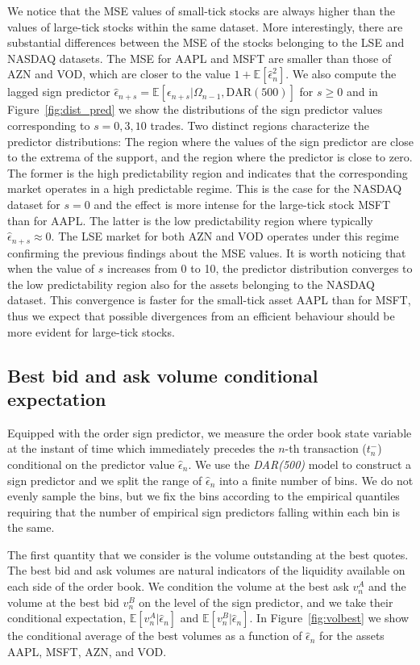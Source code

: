 \documentclass[12pt]{iopart}
\begin{document}
We notice that the MSE values of small-tick stocks are always higher than the values of large-tick stocks within the same dataset. More interestingly, there are substantial differences between the MSE of the stocks belonging to the LSE and NASDAQ datasets. The MSE for AAPL and MSFT are smaller than those of AZN and VOD, which are closer to the value $1+\mathbb{E}[\hat{\epsilon}_n^2]$. We also compute the lagged sign predictor $\hat{\epsilon}_{n+s}=\mathbb{E}[\epsilon_{n+s}|\Omega_{n-1},\mathrm{DAR(500)}]$ for $s\geq 0$ and in Figure~\ref{fig:dist_pred} we show the distributions of the sign predictor values corresponding to $s=0,3,10$ trades. Two distinct regions characterize the predictor distributions: The region where the values of the sign predictor are close to the extrema of the support, and the region where the predictor is close to zero. The former is the high predictability region and indicates that the corresponding market operates in a high predictable regime. This is the case for the NASDAQ dataset for $s=0$ and the effect is more intense for the large-tick stock MSFT than for AAPL. The latter is the low predictability region where typically $\hat{\epsilon}_{n+s}\approx 0$. The LSE market for both AZN and VOD operates under this regime confirming the previous findings about the MSE values. It is worth noticing that when the value of $s$ increases from 0 to 10, the predictor distribution converges to the low predictability region also for the assets belonging to the NASDAQ dataset. This convergence is faster for the small-tick asset AAPL than for MSFT, thus we expect that possible divergences from an efficient behaviour should be more evident for large-tick stocks.

\subsection{Best bid and ask volume conditional expectation}
Equipped with the order sign predictor, we measure the order book state variable at the instant of time which immediately precedes the $n$-th transaction ($t_n^-$) conditional on the predictor value $\hat{\epsilon}_n$. We use the \textit{DAR(500)} model to construct a sign predictor and we split the range of $\hat{\epsilon}_n$ into a finite number of bins. We do not evenly sample the bins, but we fix the bins according to the empirical quantiles requiring that the number of empirical sign predictors falling within each bin is the same.

The first quantity that we consider is the volume outstanding at the best quotes. The best bid and ask volumes are natural indicators of the liquidity available on each side of the order book. We condition the volume at the best ask $v_n^A$ and the volume at the best bid $v_n^B$ on the level of the sign predictor, and we take their conditional expectation, $\mathbb{E}[v_n^A|\hat{\epsilon}_n]$ and $\mathbb{E}[v_n^B|\hat{\epsilon}_n]$. In Figure~\ref{fig:volbest} we show the conditional average of the best volumes as a function of $\hat{\epsilon}_n$ for the assets AAPL, MSFT, AZN, and VOD. 
\end{document}

